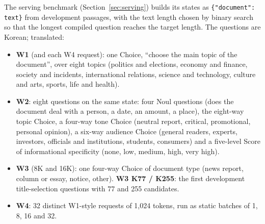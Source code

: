 The serving benchmark (Section~\ref{sec:serving}) builds its states as
\texttt{\{"document": text\}} from development passages, with the text length chosen by
binary search so that the longest compiled question reaches the target length. The questions
are Korean; translated:
\begin{itemize}
  \item \textbf{W1} (and each W4 request): one Choice, ``choose the main topic of the
    document'', over eight topics (politics and elections, economy and finance, society and
    incidents, international relations, science and technology, culture and arts, sports,
    life and health).
  \item \textbf{W2}: eight questions on the same state: four Noul questions (does the
    document deal with a person, a date, an amount, a place), the eight-way topic Choice, a
    four-way tone Choice (neutral report, critical, promotional, personal opinion), a
    six-way audience Choice (general readers, experts, investors, officials and
    institutions, students, consumers) and a five-level Score of informational specificity
    (none, low, medium, high, very high).
  \item \textbf{W3} (8K and 16K): one four-way Choice of document type (news report, column
    or essay, notice, other). \textbf{W3 K77 / K255}: the first development title-selection
    questions with 77 and 255 candidates.
  \item \textbf{W4}: 32 distinct W1-style requests of 1,024 tokens, run as static batches of
    1, 8, 16 and 32.
\end{itemize}
